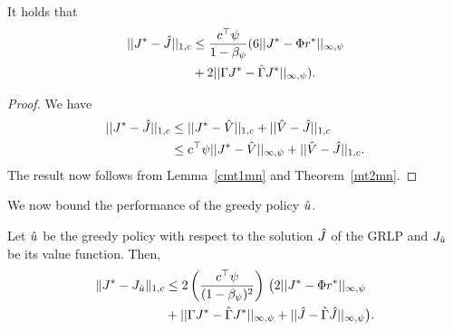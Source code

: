 \begin{theorem}
\label{cmt2mn}
It holds that
\begin{align}\label{finalbndmn}
\begin{split}
||J^*-\hj||_{1,c}
&\leq\frac{c^\top\psi}{1-\beta_\psi}(6 ||J^*-\Phi r^*||_{\mn}\\
&+2||\Gamma J^*-\hg J^*||_{\mn}).
\end{split}
\end{align}
\end{theorem}
\begin{proof}
We have
\begin{align}
||J^*-\hat{J}||_{1,c}\nonumber
&\leq||J^*-\hat{V}||_{1,c}+||\hat{V}-\hat{J}||_{1,c}\nonumber\\
&\leq c^\top \psi ||J^*-\hat{V}||_{\infty,\psi}+||\hat{V}-\hat{J}||_{1,c}.\nonumber
\end{align}
The result now follows from Lemma~\ref{cmt1mn} and Theorem~\ref{mt2mn}.
\end{proof}
We now bound the performance of the greedy policy $\hat{u}$.
\begin{theorem}
\label{polthe}
Let $\hat{u}$ be the greedy policy with respect to the solution $\hat{J}$ of the GRLP and $J_{\hat{u}}$ be its value function.
Then,
\begin{align}\label{polthebnd}
\norm{J^* - J_{\hu}}_{1,c}
&\leq 2\left(\frac{c^\top \psi}{(1-\beta_{\psi})^2}\right)\, \big( 2||J^*-\Phi r^*||_{\mn}
\nn\\&
+||\Gamma J^*-\hg J^*||_{\mn}+||\hj-\hg\hj||_{\mn}\big).
\end{align}
\end{theorem}
